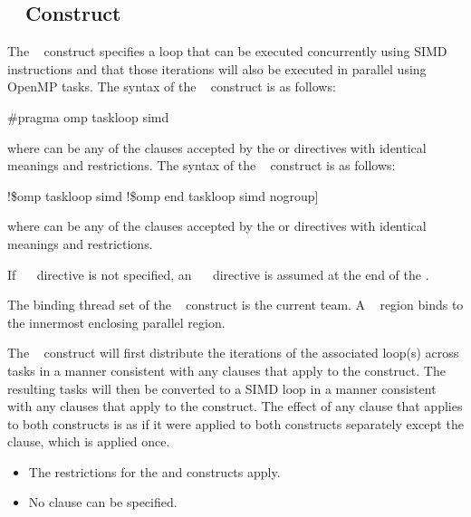 \subsection{~ Construct}
\label{subsec:taskloop simd Construct}
\summary
The ~ construct specifies a loop that can be executed concurrently using SIMD instructions and that those iterations will also be executed in parallel using OpenMP tasks.
\syntax
\ccppspecificstart
The syntax of the ~ construct is as follows:
\begin{boxedcode}
\#pragma omp taskloop simd 
\end{boxedcode}
where  can be any of the clauses accepted by the  or  directives with identical meanings and restrictions.
\ccppspecificend
\fortranspecificstart
The syntax of the ~ construct is as follows:
\begin{boxedcode}
!\$omp taskloop simd 
\plc{[}!\$omp end taskloop simd \plc{[}nogroup\plc{]}] 
\end{boxedcode}
where  can be any of the clauses accepted by the  or  directives with identical meanings and restrictions.

If ~~ directive is not specified, an ~~ directive is assumed at the end of the .
\fortranspecificend

\binding
The binding thread set of the ~ construct is the current team. A ~ region binds to the innermost enclosing parallel region.

\descr
The ~ construct will first distribute the iterations of the associated loop(s) across tasks in a manner consistent with any clauses that apply to the  construct. The resulting tasks will then be converted to a SIMD loop in a manner consistent with any clauses that apply to the  construct. The effect of any clause that applies to both constructs is as if it were applied to both constructs separately except the  clause, which is applied once.

\restrictions
\begin{itemize}
\item The restrictions for the  and  constructs apply.
\item No  clause can be specified. 
\end{itemize}

